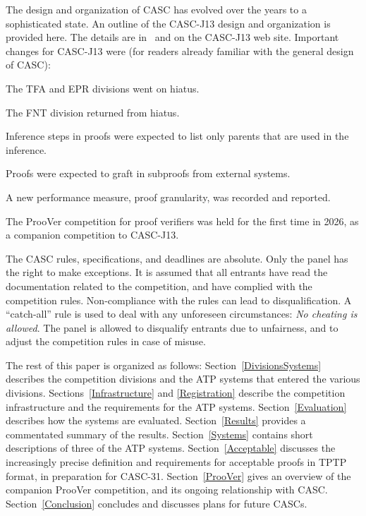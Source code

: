 \documentclass[aic]{iosart2x}
\newenvironment{packed_itemize}{
\vspace*{-0.3em}
\begin{itemize}
  \setlength{\partopsep}{0pt}
  \setlength{\itemsep}{1pt}
  \setlength{\parskip}{0pt}
  \setlength{\parsep}{0pt}
}{\end{itemize}}
\newcommand{\THIS}{\mbox{CASC-J13}}
\newcommand{\NEXT}{\mbox{CASC-31}}
\begin{document}
The design and organization of CASC has evolved over the years to a sophisticated state.
An outline of the \THIS{} design and organization is provided here.
The details are in~\cite{Sut26-CASC-J13} and on the \THIS{} web site.
Important changes for \THIS{} were
(for readers already familiar with the general design of CASC):
\begin{packed_itemize}
\item The TFA and EPR divisions went on hiatus.
\item The FNT division returned from hiatus.
\item Inference steps in proofs were expected to list only parents that are used in the inference.
\item Proofs were expected to graft in subproofs from external systems.
\item A new performance measure, proof granularity, was recorded and reported.
\item The ProoVer competition for proof verifiers was held for the first time in 2026, 
      as a companion competition to \THIS{}.
\end{packed_itemize}
The CASC rules, specifications, and deadlines are absolute.
Only the panel has the right to make exceptions.
It is assumed that all entrants have read the documentation related to the competition, and have
complied with the competition rules.
Non-compliance with the rules can lead to disqualification.
A ``catch-all'' rule is used to deal with any unforeseen circumstances: 
{\em No cheating is allowed}.
The panel is allowed to disqualify entrants due to unfairness, and to adjust the competition
rules in case of misuse.

\vspace*{0.5em}
The rest of this paper is organized as follows:
Section~\ref{DivisionsSystems} describes the competition divisions and the ATP systems that
entered the various divisions.
Sections~\ref{Infrastructure} and \ref{Registration} describe the competition infrastructure
and the requirements for the ATP systems.
Section~\ref{Evaluation} describes how the systems are evaluated.
Section~\ref{Results} provides a commentated summary of the results.
Section~\ref{Systems} contains short descriptions of three of the ATP systems.
Section~\ref{Acceptable} discusses the increasingly precise definition and requirements for
acceptable proofs in TPTP format, in preparation for \NEXT{}.
Section~\ref{ProoVer} gives an overview of the companion ProoVer competition, and its ongoing
relationship with CASC.
Section~\ref{Conclusion} concludes and discusses plans for future CASCs.
\end{document}

